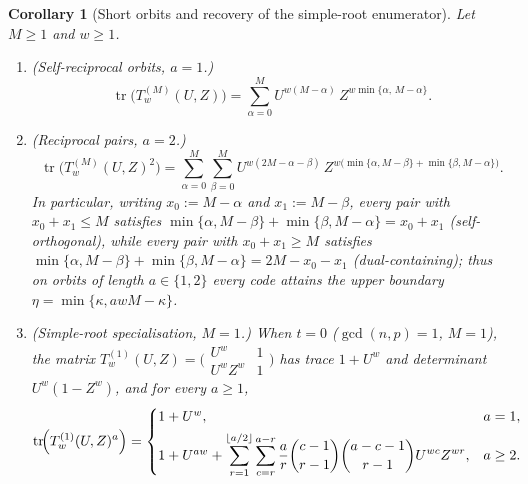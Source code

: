 \documentclass[preprint,12pt]{elsarticle}
\newcommand{\tr}{\operatorname{tr}}
\numberwithin{equation}{section}
\theoremstyle{plain}
\newtheorem{corollary}[theorem]{Corollary}
\theoremstyle{definition}
\theoremstyle{remark}
\begin{document}
\begin{corollary}[Short orbits and recovery of the simple-root enumerator]\label{cor:short-orbits}
Let $M\ge 1$ and $w\ge 1$.
\begin{enumerate}
\item[\textup{(a)}] \emph{(Self-reciprocal orbits, $a=1$.)}
\begin{equation}\label{eq:orbit-a1}
\tr\!\bigl(T_w^{(M)}(U,Z)\bigr)
 =\sum_{\alpha=0}^{M} U^{w(M-\alpha)}\,Z^{w\min\{\alpha,\,M-\alpha\}}.
\end{equation}
\item[\textup{(b)}] \emph{(Reciprocal pairs, $a=2$.)}
\begin{equation}\label{eq:orbit-a2}
\tr\!\bigl(T_w^{(M)}(U,Z)^2\bigr)
 =\sum_{\alpha=0}^{M}\sum_{\beta=0}^{M}
   U^{w(2M-\alpha-\beta)}\,
   Z^{w\bigl(\min\{\alpha,M-\beta\}+\min\{\beta,M-\alpha\}\bigr)}.
\end{equation}
In particular, writing $x_0:=M-\alpha$ and $x_1:=M-\beta$, every pair with
$x_0+x_1\le M$ satisfies $\min\{\alpha,M-\beta\}+\min\{\beta,M-\alpha\}=x_0+x_1$
(self-orthogonal), while every pair with $x_0+x_1\ge M$ satisfies
$\min\{\alpha,M-\beta\}+\min\{\beta,M-\alpha\}=2M-x_0-x_1$ (dual-containing);
thus on orbits of length $a\in\{1,2\}$ every code attains the upper boundary
$\eta=\min\{\kappa,awM-\kappa\}$.
\item[\textup{(c)}] \emph{(Simple-root specialisation, $M=1$.)} When $t=0$
($\gcd(n,p)=1$, $M=1$), the matrix $T_w^{(1)}(U,Z)=\bigl(\begin{smallmatrix}U^w & 1\\ U^wZ^w & 1\end{smallmatrix}\bigr)$
has trace $1+U^w$ and determinant $U^w(1-Z^w)$, and for every $a\ge 1$,
\begin{equation}\label{eq:M1-binomial}
\tr\!\Bigl(T_w^{(1)}(U,Z)^a\Bigr)=
\begin{cases}
1+U^w, & a=1,\\[4pt]
1+U^{aw}+\displaystyle\sum_{r=1}^{\lfloor a/2\rfloor}\sum_{c=r}^{a-r}
 \frac{a}{r}\binom{c-1}{r-1}\binom{a-c-1}{r-1}U^{wc}Z^{wr}, & a\ge 2.
\end{cases}
\end{equation}
\end{enumerate}
\end{corollary}
\end{document}
